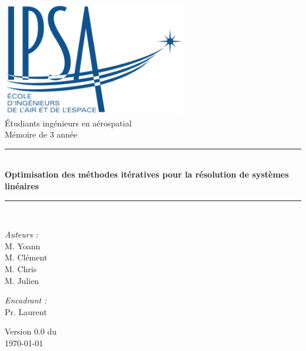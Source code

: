 \documentclass[a4paper,12pt,calibri,oneside,openany]{book}
\theoremstyle{break}
\begin{document}
\renewcommand{\bibname}{Bibliographie et Webographie}

\begin{titlepage}
\begin{center}

\includegraphics[width=0.6\textwidth]{ipsa}\\[1cm]

{\large Étudiants ingénieurs en aérospatial}\\[0.5cm]

{\large Mémoire de 3 année}\\[0.5cm]

\rule{\linewidth}{0.5mm} \\[0.4cm]
{ \huge \bfseries Optimisation des méthodes itératives pour la résolution de systèmes linéaires\\[0.4cm] }
\rule{\linewidth}{0.5mm} \\[1.5cm]

\noindent
\begin{minipage}{0.4\textwidth}
  \begin{flushleft} \large
    \emph{Auteurs :}\\
    M.  Yoann\\
    M.  Clément\\
    M.  Chris\\
    M.  Julien
  \end{flushleft}
\end{minipage}%
\begin{minipage}{0.4\textwidth}
  \begin{flushright} \large
    \emph{Encadrant :} \\
    Pr.  Laurent\\
  \end{flushright}
\end{minipage}

\vfill

{\large Version 0.0 du\\ \today}

\end{center}
\end{titlepage}
\end{document}
